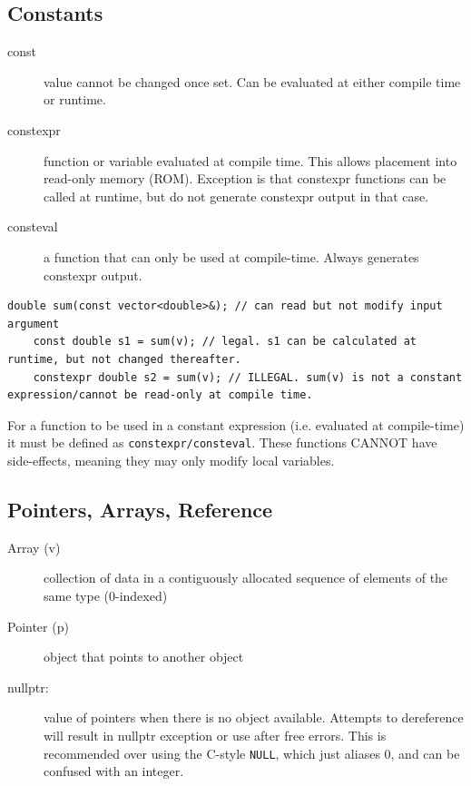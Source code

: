 \documentclass[a4paper, 10pt]{article}
\begin{document}
\subsection{Constants}
\begin{description}
	\item[const]
	      value cannot be changed once set. Can be evaluated at either compile time or runtime.
\end{description}
\begin{description}
	\item[constexpr]
	      function or variable evaluated at compile time. This allows placement into read-only memory (ROM). Exception is that constexpr functions can be called at runtime, but do not generate constexpr output in that case.
\end{description}
\begin{description}
	\item[consteval]
	      a function that can only be used at compile-time. Always generates constexpr output.
\end{description}
\begin{lstlisting}[style=cpp]
    double sum(const vector<double>&); // can read but not modify input argument
    const double s1 = sum(v); // legal. s1 can be calculated at runtime, but not changed thereafter.
    constexpr double s2 = sum(v); // ILLEGAL. sum(v) is not a constant expression/cannot be read-only at compile time.
\end{lstlisting}
For a function to be used in a constant expression (i.e. evaluated at compile-time) it must be defined as \verb!constexpr/consteval!. These functions CANNOT have side-effects, meaning they may only modify local variables.

\subsection{Pointers, Arrays, Reference}
\begin{description}
	\item[Array (v)]
	      collection of data in a contiguously allocated sequence of elements of the same type (0-indexed)
\end{description}
\begin{description}
	\item[Pointer (p)]
	      object that points to another object
\end{description}
\begin{description}
	\item[nullptr:]
	      value of pointers when there is no object available. Attempts to dereference will result in nullptr exception or use after free errors. This is recommended over using the C-style \verb!NULL!, which just aliases 0, and can be confused with an integer.
\end{description}
\end{document}
